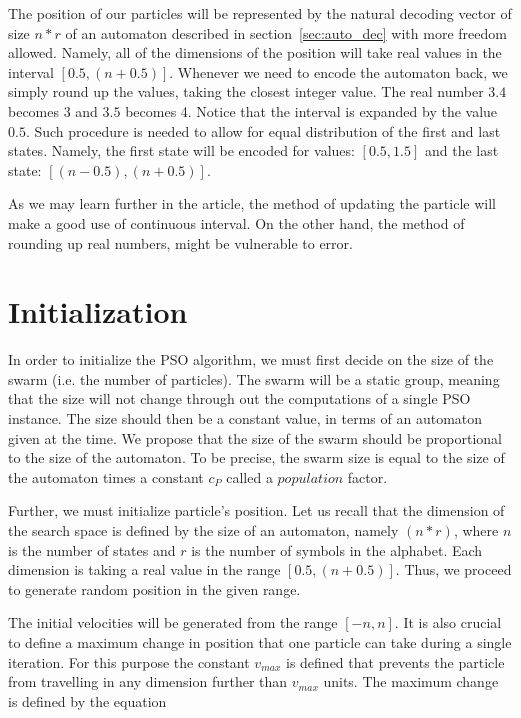 \documentclass{mini}
\begin{document}
The position of our particles will be represented by the natural decoding vector of size $n*r$ of an automaton described in section~\ref{sec:auto_dec} with more freedom allowed. Namely, all of the dimensions of the position will take real values in the interval $[0.5, (n+0.5)]$. Whenever we need to encode the automaton back, we simply round up the values, taking the closest integer value. The real number $3.4$ becomes $3$ and $3.5$ becomes 4. Notice that the interval is expanded by the value $0.5$. Such procedure is needed to allow for equal distribution of the first and last states. Namely, the first state will be encoded for values: $[0.5, 1.5]$ and the last state: $[(n-0.5), (n+0.5)]$.

As we may learn further in the article, the method of updating the particle will make a good use of continuous interval. On the other hand, the method of rounding up real numbers, might be vulnerable to error.



\section{Initialization}
In order to initialize the PSO algorithm, we must first decide on the size of the swarm (i.e. the number of particles). The swarm will be a static group, meaning that the size will not change through out the computations of a single PSO instance. The size should then be a constant value, in terms of an automaton given at the time. We propose that the size of the swarm should be proportional to the size of the automaton. To be precise, the swarm size is equal to the size of the automaton times a constant $c_P$ called a $population$ factor.

Further, we must initialize particle's position. Let us recall that the dimension of the search space is defined by the size of an automaton, namely $(n*r)$, where $n$ is the number of states and $r$ is the number of symbols in the alphabet. Each dimension is taking a real value in the range $[0.5, (n+0.5)]$. Thus, we proceed to generate random position in the given range.

The initial velocities will be generated from the range $[-n,n]$. It is also crucial to define a maximum change in position that one particle can take during a single iteration. For this purpose the constant $v_{max}$ is defined that prevents the particle from travelling in any dimension further than $v_{max}$ units. The maximum change is defined by the equation 
\end{document}
